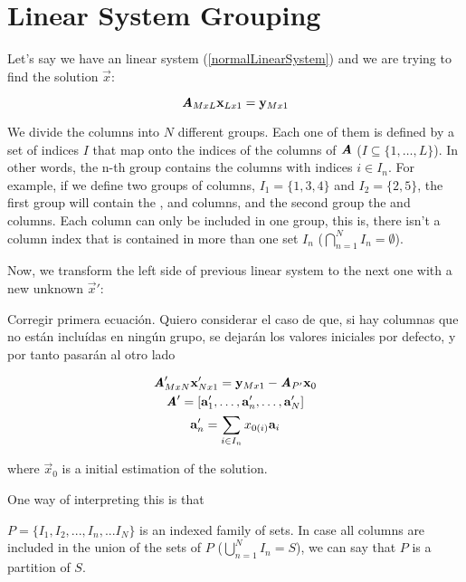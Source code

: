 \chapter{Linear System Grouping}

Let's say we have an linear system (\autoref{normalLinearSystem}) and we are trying to find the solution $\vec{x}$:

\begin{equation}
\bm{\mathit{A}}_{MxL} \mathbf{x}_{Lx1} = \mathbf{y}_{Mx1}
\label{normalLinearSystem}
\end{equation}

We divide the columns into $N$ different groups. Each one of them is defined by a set of indices $I$ that map onto the indices of the columns of $\bm{\mathit{A}}$ ($I \subseteq \{1, \ldots, L\}$). In other words, the n-th group contains the columns with indices $i \in I_n$. For example, if we define two groups of columns, $I_1 = \{1, 3, 4\}$ and $I_2 = \{2, 5\}$, the first group will contain the ,  and  columns, and the second group the  and  columns. Each column can only be included in one group, this is, there isn't a column index that is contained in more than one set $I_n$ ($\bigcap_{n = 1}^{N} I_{n} = \emptyset$).

Now, we transform the left side of previous linear system to the next one with a new unknown $\vec{x}'$:

Corregir primera ecuación. Quiero considerar el caso de que, si hay columnas que no están incluídas en ningún grupo, se dejarán los valores iniciales por defecto, y por tanto pasarán al otro lado

\begin{gather}
\bm{\mathit{A}}'_{MxN} \mathbf{x}'_{Nx1} = \mathbf{y}_{Mx1} - \bm{\mathit{A}}_{P'} \mathbf{x}_0\\
\bm{\mathit{A}}' = [\mathbf{a}'_1,\ldots, \mathbf{a}'_n, \ldots, \mathbf{a}'_N] \\
\mathbf{a}'_n = \sum_{i \in I_n} x_{0(i)} \mathbf{a}_i
\end{gather}

where $\vec{x}_0$ is a initial estimation of the solution.

One way of interpreting this is that 

$P = \{I_1, I_2, ..., I_n,... I_N\}$ is an indexed family of sets. %
In case all columns are included in the union of the sets of $P$ ($\bigcup_{n = 1}^{N} I_{n} = S$), we can say that $P$ is a partition of $S$.

